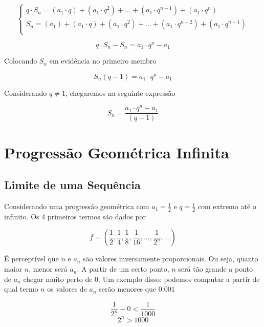 \begin{tcolorbox}[colback=LightYellow]
\begin{equation*}
  \begin{cases}
    q\cdot S_{n} = (a_{1}\cdot q) + (a_{1}\cdot q^{2}) + \dots + (a_{1}\cdot q^{n - 1}) + (a_{1}\cdot q^{n}) \\
    S_{n} = (a_{1}) + (a_{1}\cdot q) + (a_{1}\cdot q^{2}) + \dots + (a_{1}\cdot q^{n - 2}) + (a_{1}\cdot q^{n - 1}) \\
  \end{cases}
\end{equation*}

\[q\cdot S_{n} - S_{n} = a_{1}\cdot q^{n} - a_{1}\]

Colocando $S_{n}$ em evidência no primeiro membro

\[S_{n} (q - 1) = a_{1}\cdot q^{n} - a_{1}\]

\end{tcolorbox}
Considerando $q \neq 1$, chegaremos na seguinte expressão

\[S_{n} = \frac{a_{1} \cdot q^{n} - a_{1}}{(q - 1)}\]

\section{Progressão Geométrica Infinita}

\subsection{Limite de uma Sequência}

Considerando uma progressão geométrica com $a_{1} = \frac{1}{2}$ e $q = \frac{1}{2}$ com extremo até o infinito. Os 4 primeiros termos são dados por

\begin{tcolorbox}[colback=LightYellow]
\[f = \left(\frac{1}{2}, \frac{1}{4}, \frac{1}{8}, \frac{1}{16}, \dots, \frac{1}{2^{n}}, \dots \right)\]
\end{tcolorbox}

É perceptível que $n$ e $a_{n}$ são valores inversamente proporcionais. Ou seja, quanto maior $n$, menor será $a_{n}$. A partir de um certo ponto, $n$ será tão grande a ponto de $a_{n}$ chegar muito perto de 0. Um exemplo disso: podemos computar a partir de qual termo $n$ os valores de $a_{n}$ serão menores que $0.001$

\begin{tcolorbox}[colback=LightYellow]
\[\frac{1}{2^{n}} - 0 < \frac{1}{1000}\]
\[2^{n} > 1000\]
\end{tcolorbox}

